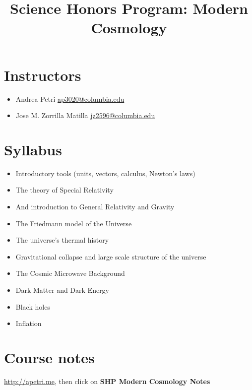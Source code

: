 \documentclass[11pt, a4paper,oneside,openright]{article}
\numberwithin{equation}{section}
\begin{document}
\title{Science Honors Program: Modern Cosmology}
\author{}
\date{}
\maketitle

\section*{Instructors}
\begin{itemize}
\item Andrea Petri \url{ap3020@columbia.edu}
\item Jose M. Zorrilla Matilla \url{jz2596@columbia.edu}
\end{itemize}

\section*{Syllabus}
\begin{itemize}
\item Introductory tools (units, vectors, calculus, Newton's laws)
\item The theory of Special Relativity
\item And introduction to General Relativity and Gravity
\item The Friedmann model of the Universe
\item The universe's thermal history
\item Gravitational collapse and large scale structure of the universe
\item The Cosmic Microwave Background
\item Dark Matter and Dark Energy
\item Black holes
\item Inflation
\end{itemize}

\section*{Course notes}
\url{http://apetri.me}, then click on \textbf{SHP Modern Cosmology Notes}
\end{document}
